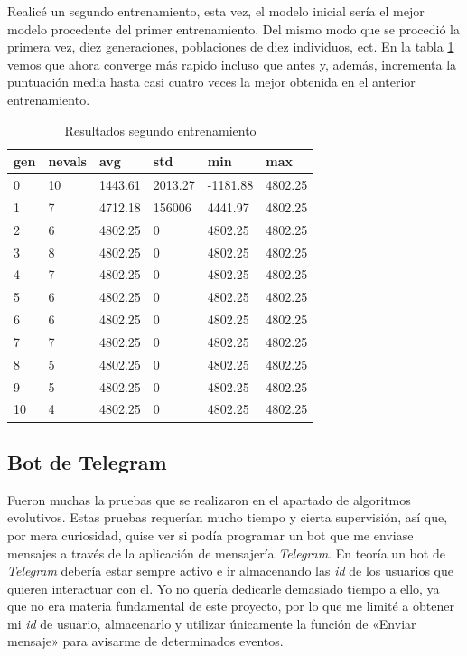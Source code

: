 Realicé un segundo entrenamiento, esta vez, el modelo inicial sería el mejor modelo procedente del primer entrenamiento. Del mismo modo que se procedió la primera vez, diez generaciones, poblaciones de diez individuos, ect. En la tabla \ref{result_segundo_entr} vemos que ahora converge más rapido incluso que antes y, además, incrementa la puntuación media hasta casi cuatro veces la mejor obtenida en el anterior entrenamiento.

\begin{table}[]
\centering
\begin{tabular}{|l|l|l|l|l|l|}
\hline
\rowcolor[HTML]{C0C0C0} 
gen & nevals & avg     & std     & min      & max     \\ \hline
0   & 10     & 1443.61 & 2013.27 & -1181.88 & 4802.25 \\ \hline
1   & 7      & 4712.18 & 156006  & 4441.97  & 4802.25 \\ \hline
2   & 6      & 4802.25 & 0       & 4802.25  & 4802.25 \\ \hline
3   & 8      & 4802.25 & 0       & 4802.25  & 4802.25 \\ \hline
4   & 7      & 4802.25 & 0       & 4802.25  & 4802.25 \\ \hline
5   & 6      & 4802.25 & 0       & 4802.25  & 4802.25 \\ \hline
6   & 6      & 4802.25 & 0       & 4802.25  & 4802.25 \\ \hline
7   & 7      & 4802.25 & 0       & 4802.25  & 4802.25 \\ \hline
8   & 5      & 4802.25 & 0       & 4802.25  & 4802.25 \\ \hline
9   & 5      & 4802.25 & 0       & 4802.25  & 4802.25 \\ \hline
10  & 4      & 4802.25 & 0       & 4802.25  & 4802.25 \\ \hline
\end{tabular}
\caption{Resultados segundo entrenamiento}
\label{result_segundo_entr}
\end{table}


\subsection{Bot de Telegram}
Fueron muchas la pruebas que se realizaron en el apartado de algoritmos evolutivos. Estas pruebas requerían mucho tiempo y cierta supervisión, así que, por mera curiosidad, quise ver si podía programar un bot que me enviase mensajes a través de la aplicación de mensajería \emph{Telegram}. 
En teoría un bot de \emph{Telegram} debería estar sempre activo e ir almacenando las \emph{id}  de los usuarios que quieren interactuar con el. Yo no quería dedicarle demasiado tiempo a ello, ya que no era materia fundamental de este proyecto, por lo que me limité a obtener mi \emph{id} de usuario, almacenarlo y utilizar únicamente la función de «Enviar mensaje» para avisarme de determinados eventos.


